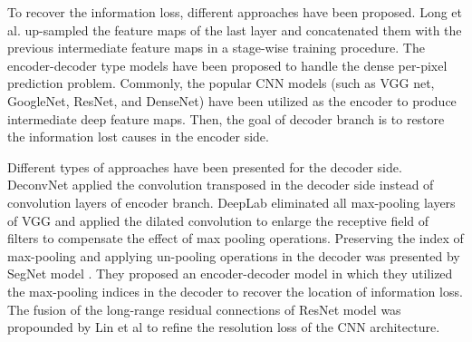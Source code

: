 \documentclass[journal,transmag]{IEEEtran}
\begin{document}
 To recover the information loss, different approaches have been proposed. Long et al. \cite{long2015fully,long2015fully_jo} up-sampled the feature maps of the last layer  and concatenated them with the previous intermediate feature maps in a stage-wise training procedure. The encoder-decoder type models \cite{lin2017refinenet,kendall2015bayesian,badrinarayanan2015segnet} have been proposed to handle the dense per-pixel prediction problem. Commonly, the popular CNN models (such as VGG net, GoogleNet, ResNet, and DenseNet) have been utilized as the encoder to produce intermediate deep feature maps. Then, the goal of decoder branch is to restore the information lost causes in the encoder side. 
 
 Different types of approaches have been presented for the decoder side. DeconvNet \cite{noh2015learning} applied the convolution transposed in the decoder side instead of convolution layers of encoder branch. DeepLab \cite{chen2016deeplab, chen2018deeplab_j, chen2018encoder} eliminated all max-pooling layers of VGG and applied the dilated convolution to enlarge the receptive field of filters to compensate the effect of max pooling operations. Preserving the index of max-pooling and applying un-pooling operations in the decoder was presented by  SegNet model \cite{badrinarayanan2015segnet}. They proposed an encoder-decoder model in which they utilized the max-pooling indices in the decoder to recover the location of information loss. The fusion of the long-range residual connections of ResNet model was propounded by Lin et al \cite{lin2017refinenet} to refine the resolution loss of the CNN architecture. 
 
\end{document}
